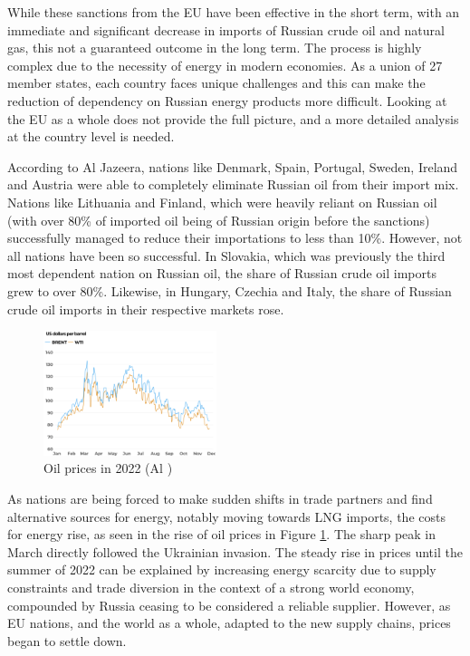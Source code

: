 \documentclass[12pt]{article}
\begin{document}
While these sanctions from the EU have been effective in the short term, with an immediate and significant decrease in imports of Russian crude oil and natural gas, this not a guaranteed outcome in the long term. The process is highly complex due to the necessity of energy in modern economies. As a union of 27 member states, each country faces unique challenges and this  can make the reduction of dependency on Russian energy products more difficult. Looking at the EU as a whole does not provide the full picture, and a more detailed analysis at the country level is needed.

According to Al Jazeera, nations like Denmark, Spain, Portugal, Sweden, Ireland and Austria were able to completely eliminate Russian oil from their import mix. Nations like Lithuania and Finland, which were heavily reliant on Russian oil (with over 80\% of imported oil being of Russian origin before the sanctions) successfully managed to reduce their importations to less than 10\%. However, not all nations have been so successful. In Slovakia, which was previously the third most dependent nation on Russian oil, the share of Russian crude oil imports grew to over 80\%. Likewise, in Hungary, Czechia and Italy, the share of Russian crude oil imports in their respective markets rose.

\begin{figure}[h]
    \centering
    \includegraphics[width=0.45\textwidth]{images/oil prices.png}
    \caption{Oil prices in 2022 (Al \citeauthor{al_jazeera_2022})}
    \label{fig:oil prices}
\end{figure}

As nations are being forced to make sudden shifts in trade partners and find alternative sources for energy, notably moving towards LNG imports, the costs for energy rise, as seen in the rise of oil prices in Figure \ref{fig:oil prices}. The sharp peak in March directly followed the Ukrainian invasion. The steady rise in prices until the summer of 2022 can be explained by increasing energy scarcity due to supply constraints and trade diversion in the context of a strong world economy, compounded by Russia ceasing to be considered a reliable supplier. However, as EU nations, and the world as a whole, adapted to the new supply chains, prices began to settle down. 
\end{document}
